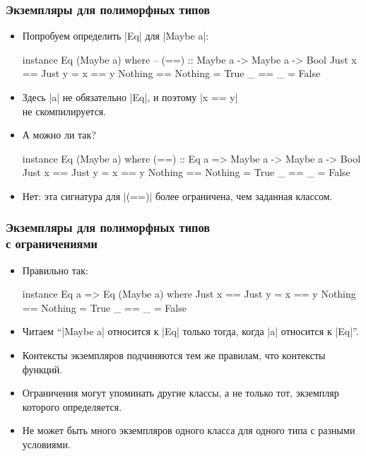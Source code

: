\documentclass[10pt]{beamer}
\begin{document}
\begin{frame}[fragile]
  \frametitle{Экземпляры для полиморфных типов}
  \begin{itemize}
    \item Попробуем определить \haskinline|Eq| для \haskinline|Maybe a|:\pause
          \begin{haskell}
            instance Eq (Maybe a) where
                -- (==) :: Maybe a -> Maybe a -> Bool
                Just x == Just y = x == y
                Nothing == Nothing = True
                _ == _ = False
          \end{haskell}
           \pause
    \item Здесь \haskinline|a| не обязательно \haskinline|Eq|, и поэтому \haskinline|x == y| \\не скомпилируется.
    \item А можно ли так?
          \begin{haskell}
            instance Eq (Maybe a) where
                (==) :: Eq a => Maybe a -> Maybe a -> Bool
                Just x == Just y = x == y
                Nothing == Nothing = True
                _ == _ = False
          \end{haskell}
          \pause
    \item Нет: эта сигнатура для \haskinline|(==)| более ограничена, чем заданная классом.
  \end{itemize}
\end{frame}

\begin{frame}[fragile]
  \frametitle{Экземпляры для полиморфных типов \\с ограничениями}
  \begin{itemize}
    \item Правильно так:
          \begin{haskell}
            instance Eq a => Eq (Maybe a) where
                Just x == Just y = x == y
                Nothing == Nothing = True
                _ == _ = False
          \end{haskell}
    \item Читаем \enquote{\haskinline|Maybe a| относится к \haskinline|Eq| только тогда, когда \haskinline|a| относится к \haskinline|Eq|}.
    \item Контексты экземпляров подчиняются тем же правилам, что контексты функций.
    \item Ограничения могут упоминать другие классы, а не только тот, экземпляр которого определяется.
    \item Не может быть много экземпляров одного класса для одного типа с разными условиями.
  \end{itemize}
\end{frame}
\end{document}
